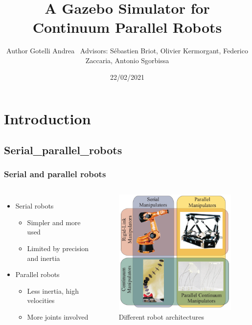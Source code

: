 \documentclass[compress]{thesisbeamer}
\title{A Gazebo Simulator for Continuum Parallel Robots}
\author[Gotelli Andrea]{Author Gotelli Andrea\newline ~ \newline \normalsize{Advisors: Sébastien Briot, Olivier Kermorgant, Federico Zaccaria, Antonio Sgorbissa}}
\date{22/02/2021}
\begin{document}
\MakeTitleNoFoot

    
   	\section{Introduction}
        \subsection{Serial_parallel_robots}
        \frametitle{Serial and parallel robots}
        \begin{frame}
            \begin{columns}
			\begin{itemize}%
  				\item Serial robots
  				\begin{itemize}%
   					\item Simpler and more used
   					\item Limited by precision and inertia
  				\end{itemize}\vfill
  				\item Parallel robots
  				\begin{itemize}%
   					\item Less inertia, high velocities
   					\item More joints involved
  				\end{itemize}\vfill
 			\end{itemize}
			\vspace{2cm}
			\begin{figure}[h]
				\centering
				\includegraphics[width=\textwidth]{images/serial_parall_robots}
				\caption{Different robot architectures}
			\end{figure}
			\end{columns}
		\end{frame}
\end{document}
